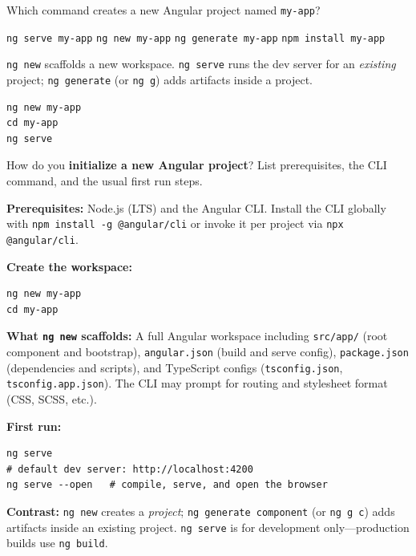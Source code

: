 \question[4]
Which command creates a new Angular project named \texttt{my-app}?
\begin{choices}
  \choice \lstinline[style=bashinline]|ng serve my-app|
  \CorrectChoice \lstinline[style=bashinline]|ng new my-app|
  \choice \lstinline[style=bashinline]|ng generate my-app|
  \choice \lstinline[style=bashinline]|npm install my-app|
\end{choices}
\begin{solution}
  \lstinline[style=bashinline]|ng new| scaffolds a new workspace. \lstinline[style=bashinline]|ng serve| runs the dev server for an \emph{existing} project; \lstinline[style=bashinline]|ng generate| (or \lstinline[style=bashinline]|ng g|) adds artifacts inside a project.
\begin{lstlisting}[style=bash]
ng new my-app
cd my-app
ng serve
\end{lstlisting}
\end{solution}





\newpage




\question[6]
How do you \textbf{initialize a new Angular project}? List prerequisites, the CLI command, and the usual first run steps.
\begin{solutionorbox}[5in]
\textbf{Prerequisites:} Node.js (LTS) and the Angular CLI. Install the CLI globally with \lstinline[style=bashinline]|npm install -g @angular/cli| or invoke it per project via \lstinline[style=bashinline]|npx @angular/cli|.

\textbf{Create the workspace:}
\begin{lstlisting}[style=bash]
ng new my-app
cd my-app
\end{lstlisting}

\textbf{What \lstinline[style=bashinline]|ng new| scaffolds:} A full Angular workspace including \texttt{src/app/} (root component and bootstrap), \texttt{angular.json} (build and serve config), \texttt{package.json} (dependencies and scripts), and TypeScript configs (\texttt{tsconfig.json}, \texttt{tsconfig.app.json}). The CLI may prompt for routing and stylesheet format (CSS, SCSS, etc.).

\textbf{First run:}
\begin{lstlisting}[style=bash]
ng serve
# default dev server: http://localhost:4200
ng serve --open   # compile, serve, and open the browser
\end{lstlisting}

\textbf{Contrast:} \lstinline[style=bashinline]|ng new| creates a \emph{project}; \lstinline[style=bashinline]|ng generate component| (or \lstinline[style=bashinline]|ng g c|) adds artifacts inside an existing project. \lstinline[style=bashinline]|ng serve| is for development only---production builds use \lstinline[style=bashinline]|ng build|.
\end{solutionorbox}


